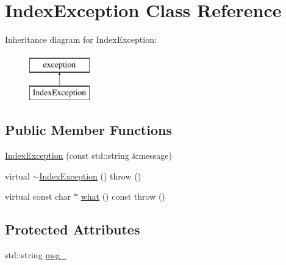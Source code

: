 \hypertarget{classIndexException}{\section{Index\-Exception Class Reference}
\label{classIndexException}
}
Inheritance diagram for Index\-Exception\-:\begin{figure}[H]
\begin{center}
\leavevmode
\includegraphics[height=2.000000cm]{classIndexException}
\end{center}
\end{figure}
\subsection*{Public Member Functions}
\begin{DoxyCompactItemize}
\item 
\hyperlink{classIndexException_a32daacc468d194f92ac751d6e494952c}{Index\-Exception} (const std\-::string \&message)
\item 
virtual \hyperlink{classIndexException_ae3d5c738908ae11ede325e8cb674f283}{$\sim$\-Index\-Exception} ()  throw ()
\item 
virtual const char $\ast$ \hyperlink{classIndexException_ab9b53256b4b83df89f56fc97ab483592}{what} () const   throw ()
\end{DoxyCompactItemize}
\subsection*{Protected Attributes}
\begin{DoxyCompactItemize}
\item 
std\-::string \hyperlink{classIndexException_a010d6862b568fbdea2deb078f7bc179f}{msg\-\_\-}
\end{DoxyCompactItemize}


